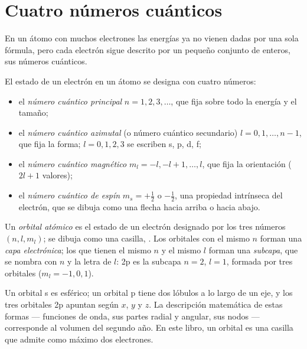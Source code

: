 \section{Cuatro números cuánticos}

En un átomo con muchos electrones las energías ya no vienen dadas por una
sola fórmula, pero cada electrón sigue descrito por un pequeño conjunto
de enteros, sus números cuánticos.

\begin{definition}\label{def:b1:quantum-numbers:quantum-number}
El estado de un electrón en un átomo se designa con cuatro números:
\begin{itemize}
  \item el \emph{número cuántico principal}
        $n = 1, 2, 3, \dots$, que fija sobre todo la energía y el tamaño;
  \item el \emph{número cuántico azimutal}
        (o número cuántico secundario) $l = 0, 1, \dots, n-1$, que fija
        la forma; $l = 0, 1, 2, 3$ se escriben s, p, d, f;
  \item el \emph{número cuántico magnético}
        $m_l = -l, -l+1, \dots, l$, que fija la orientación ($2l + 1$
        valores);
  \item el \emph{número cuántico de espín}
        $m_s = +\tfrac12$ o $-\tfrac12$, una propiedad intrínseca del
        electrón, que se dibuja como una flecha hacia arriba o hacia abajo.
\end{itemize}
\end{definition}

\begin{definition}\label{def:b1:quantum-numbers:orbital}
Un \emph{orbital atómico} es el estado de un electrón
designado por los tres números $(n, l, m_l)$; se dibuja como una casilla,
\omorbs{}. Los orbitales con el mismo $n$ forman una \emph{capa
electrónica}; los que tienen el mismo $n$ y el mismo $l$ forman una
\emph{subcapa}, que se nombra con $n$ y la letra de $l$:
2p es la subcapa $n = 2$, $l = 1$, formada por tres orbitales
($m_l = -1, 0, 1$).
\end{definition}

\begin{remark}[Formas]\label{rem:b1:quantum-numbers:shapes}
Un orbital s es esférico; un orbital p tiene dos lóbulos a lo largo de un
eje, y los tres orbitales 2p apuntan según $x$, $y$ y $z$. La descripción
matemática de estas formas --- funciones de onda, sus partes radial y
angular, sus nodos --- corresponde al volumen del segundo año. En este
libro, un orbital es una casilla que admite como máximo dos electrones.
\end{remark}


